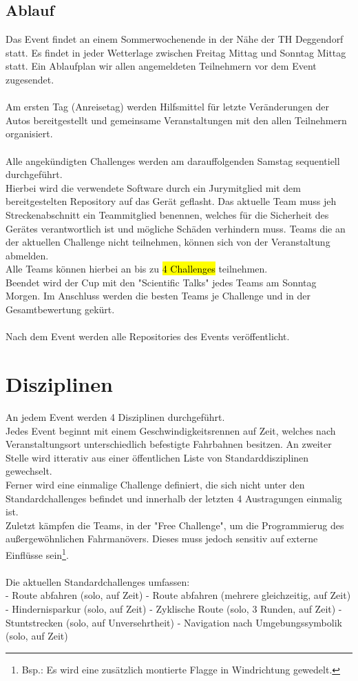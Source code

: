 \documentclass[11pt]{article}
\begin{document}
\subsection{Ablauf}
Das Event findet an einem Sommerwochenende in der Nähe der TH Deggendorf statt. Es findet in jeder Wetterlage zwischen Freitag Mittag und Sonntag Mittag statt. Ein Ablaufplan wir allen angemeldeten Teilnehmern vor dem Event zugesendet.\\
\\
Am ersten Tag (Anreisetag) werden Hilfsmittel für letzte Veränderungen der Autos bereitgestellt und gemeinsame Veranstaltungen mit den allen Teilnehmern organisiert.\\
\\
Alle angekündigten Challenges werden am darauffolgenden Samstag sequentiell durchgeführt.\\
Hierbei wird die verwendete Software durch ein Jurymitglied mit dem bereitgestelten Repository auf das Gerät geflasht. Das aktuelle Team muss jeh Streckenabschnitt ein Teammitglied benennen, welches für die Sicherheit des Gerätes verantwortlich ist und mögliche Schäden verhindern muss.
Teams die an der aktuellen Challenge nicht teilnehmen, können sich von der Veranstaltung abmelden.\\  
Alle Teams können hierbei an bis zu \hl{4 Challenges} teilnehmen.
\\
Beendet wird der Cup mit den "Scientific Talks" jedes Teams am Sonntag Morgen. Im Anschluss werden die besten Teams je Challenge und in der Gesamtbewertung gekürt.\\
\\
Nach dem Event werden alle Repositories des Events veröffentlicht.\\


\section{Disziplinen}
An jedem Event werden 4 Disziplinen durchgeführt.\\
Jedes Event beginnt mit einem Geschwindigkeitsrennen auf Zeit, welches nach Veranstaltungsort unterschiedlich befestigte Fahrbahnen besitzen. An zweiter Stelle wird itterativ aus einer öffentlichen Liste von Standarddisziplinen gewechselt.\\
Ferner wird eine einmalige Challenge definiert, die sich nicht unter den Standardchallenges befindet und innerhalb der letzten 4 Austragungen einmalig ist.\\
Zuletzt kämpfen die Teams, in der "Free Challenge", um die Programmierug des außergewöhnlichen Fahrmanövers. Dieses muss jedoch sensitiv auf externe Einflüsse sein\footnote{Bsp.: Es wird eine zusätzlich montierte Flagge in Windrichtung gewedelt.}.\\
\\
Die aktuellen Standardchallenges umfassen:\\
- Route abfahren (solo, auf Zeit)
- Route abfahren (mehrere gleichzeitig, auf Zeit)
- Hindernisparkur (solo, auf Zeit)
- Zyklische Route (solo, 3 Runden, auf Zeit)
- Stuntstrecken (solo, auf Unversehrtheit)
- Navigation nach Umgebungssymbolik (solo, auf Zeit)
\end{document}
